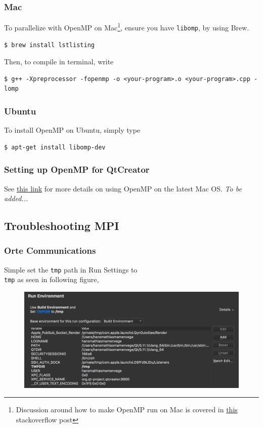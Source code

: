 \documentclass[11pt]{article}
\begin{document}
\subsubsection{Mac}
To parallelize with OpenMP on Mac\footnote{Discussion around how to make OpenMP run on Mac is covered in \href{https://stackoverflow.com/questions/39979836/using-openmp-with-c11-on-mac-os}{this} stackoverflow post}, ensure you have \texttt{libomp}, by using Brew.
\begin{lstlisting}
$ brew install lstlisting
\end{lstlisting}
Then, to compile in terminal, write
\begin{lstlisting}
$ g++ -Xpreprocessor -fopenmp -o <your-program>.o <your-program>.cpp -lomp
\end{lstlisting}
\subsubsection{Ubuntu}
To install OpenMP on Ubuntu, simply type
\begin{lstlisting}
$ apt-get install libomp-dev
\end{lstlisting}

\subsubsection{Setting up OpenMP for QtCreator}
See \href{https://iscinumpy.gitlab.io/post/omp-on-high-sierra/}{this link} for more details on using OpenMP on the latest Mac OS.
\textit{To be added...}

\subsection{Troubleshooting MPI}
\subsubsection{Orte Communications}
Simple set the \texttt{tmp} path in Run Settings to \texttt{\\tmp} as seen in following figure,
\begin{figure}[H]
    \centering
    \includegraphics[width=\textwidth]{figures/mpi/mpi_run_envoirement.png}
\end{figure}
\end{document}
